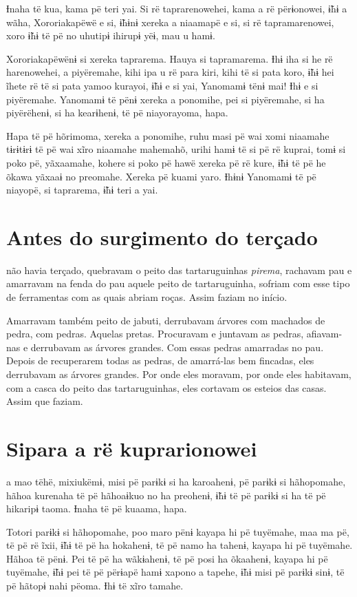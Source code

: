 Ɨnaha të kua, kama pë teri yai. Si rë taprarenowehei, kama a rë
 përɨonowei, ɨ̃hɨ a wãha, Xororiakapëwë e si, ɨ̃hɨnɨ xereka a niaamapë e
 si, si rë tapramarenowei, xoro ɨ̃hɨ të pë no uhutipɨ ihirupɨ yëɨ, mau u
 hamɨ.

Xororiakapëwënɨ si xereka taprarema. Hauya si tapramarema. Ɨhɨ iha si he
rë harenowehei, a piyëremahe, kihi ipa u rë para kiri, kihi të si pata
koro, ɨ̃hɨ hei ĩhete rë të si pata yamoo kurayoi, ɨ̃hɨ e si yai,
Yanomamɨ tënɨ mai! Ɨhɨ e si piyëremahe. Yanomamɨ të pënɨ xereka a
ponomihe, pei si piyëremahe, si ha piyërëhenɨ, si ha kearɨhenɨ, të pë
niayorayoma, hapa. 

Hapa të pë hõrimoma, xereka a ponomihe, ruhu masi pë wai xomi niaamahe
tɨrɨtɨrɨ të pë wai xĩro niaamahe mahemahõ, urihi hamɨ të si pë rë
kuprai, tomɨ si poko pë, yãxaamahe, kohere si poko pë hawë xereka pë rë
kure, ɨ̃hɨ të pë he õkawa yãxaaɨ no preomahe. Xereka pë kuami yaro.
Ɨhɨnɨ Yanomamɨ të pë niayopë, si taprarema, ɨ̃hɨ teri a yai.

\chapter{Antes do surgimento do terçado}
 
 não havia terçado, quebravam o peito das
tartaruguinhas \textit{pirema}, rachavam pau e amarravam na fenda do pau
aquele peito de tartaruguinha, sofriam com esse tipo de ferramentas com
as quais abriam roças. Assim faziam no início.

Amarravam também peito de jabuti, derrubavam árvores com machados de
pedra, com pedras. Aquelas pretas. Procuravam e juntavam as pedras,
afiavam-nas e derrubavam as árvores grandes. Com essas pedras amarradas
no pau. Depois de recuperarem todas as pedras, de amarrá-las bem
fincadas, eles derrubavam as árvores grandes. Por onde eles moravam, por
onde eles habitavam, com a casca do peito das tartaruguinhas, eles
cortavam os esteios das casas. Assim que faziam.

\chapter{Sipara a rë kuprarionowei}
 
 a mao tëhë, mixiukëmɨ, misi pë parɨkɨ si ha karoahenɨ, pë
parɨkɨ si hãhopomahe, hãhoa kurenaha të pë hãhoaɨkuo no ha preohenɨ,
ɨ̃hɨ të pë parɨkɨ si ha të pë hikaripɨ taoma. Ɨnaha të pë kuaama, hapa.

Totori parɨkɨ si hãhopomahe, poo maro pënɨ kayapa hi pë tuyëmahe, maa ma
pë, të pë rë ĩxii, ɨ̃hɨ të pë ha hokahenɨ, të pë namo ha tahenɨ, kayapa
hi pë tuyëmahe. Hãhoa të pënɨ. Pei të pë ha wãkɨahenɨ, të pë posi ha
õkaahenɨ, kayapa hi pë tuyëmahe, ɨ̃hɨ pei të pë përɨapë hamɨ xapono a
tapehe, ɨ̃hɨ misi pë parɨkɨ sinɨ, të pë hãtopɨ nahi pëoma. Ɨhɨ të xĩro
tamahe. 

